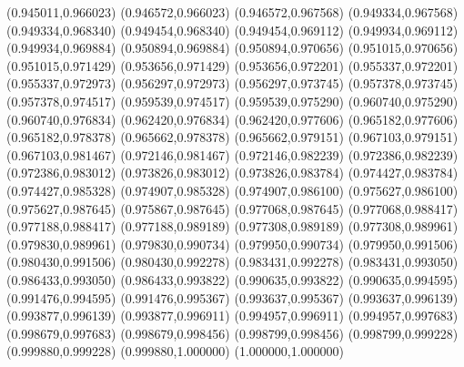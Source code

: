 (0.945011,0.966023)
(0.946572,0.966023)
(0.946572,0.967568)
(0.949334,0.967568)
(0.949334,0.968340)
(0.949454,0.968340)
(0.949454,0.969112)
(0.949934,0.969112)
(0.949934,0.969884)
(0.950894,0.969884)
(0.950894,0.970656)
(0.951015,0.970656)
(0.951015,0.971429)
(0.953656,0.971429)
(0.953656,0.972201)
(0.955337,0.972201)
(0.955337,0.972973)
(0.956297,0.972973)
(0.956297,0.973745)
(0.957378,0.973745)
(0.957378,0.974517)
(0.959539,0.974517)
(0.959539,0.975290)
(0.960740,0.975290)
(0.960740,0.976834)
(0.962420,0.976834)
(0.962420,0.977606)
(0.965182,0.977606)
(0.965182,0.978378)
(0.965662,0.978378)
(0.965662,0.979151)
(0.967103,0.979151)
(0.967103,0.981467)
(0.972146,0.981467)
(0.972146,0.982239)
(0.972386,0.982239)
(0.972386,0.983012)
(0.973826,0.983012)
(0.973826,0.983784)
(0.974427,0.983784)
(0.974427,0.985328)
(0.974907,0.985328)
(0.974907,0.986100)
(0.975627,0.986100)
(0.975627,0.987645)
(0.975867,0.987645)
(0.977068,0.987645)
(0.977068,0.988417)
(0.977188,0.988417)
(0.977188,0.989189)
(0.977308,0.989189)
(0.977308,0.989961)
(0.979830,0.989961)
(0.979830,0.990734)
(0.979950,0.990734)
(0.979950,0.991506)
(0.980430,0.991506)
(0.980430,0.992278)
(0.983431,0.992278)
(0.983431,0.993050)
(0.986433,0.993050)
(0.986433,0.993822)
(0.990635,0.993822)
(0.990635,0.994595)
(0.991476,0.994595)
(0.991476,0.995367)
(0.993637,0.995367)
(0.993637,0.996139)
(0.993877,0.996139)
(0.993877,0.996911)
(0.994957,0.996911)
(0.994957,0.997683)
(0.998679,0.997683)
(0.998679,0.998456)
(0.998799,0.998456)
(0.998799,0.999228)
(0.999880,0.999228)
(0.999880,1.000000)
(1.000000,1.000000)